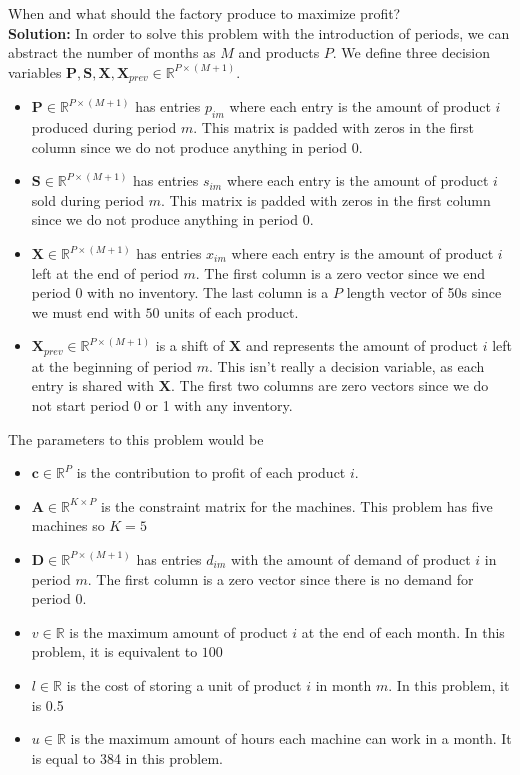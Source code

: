 \documentclass[11pt]{article}
\begin{document}
When and what should the factory produce to maximize profit?
\\
\textbf{Solution: }
In order to solve this problem with the introduction of periods, we can abstract the number of months as $M$ and products $P$.
We define three decision variables $\textbf{P}, \textbf{S}, \textbf{X}, \textbf{X}_{prev} \in \mathbb{R}^{P \times (M+1)}$.
\begin{itemize}
  \item $\textbf{P} \in \mathbb{R}^{P \times (M+1)}$ has entries $p_{i m}$ where each entry is the amount of product $i$ produced during period $m$. 
        This matrix is padded with zeros in the first column since we do not produce anything in period 0.
  \item $\textbf{S} \in \mathbb{R}^{P \times (M+1)}$ has entries $s_{i m}$ where each entry is the amount of product $i$ sold during period $m$.
        This matrix is padded with zeros in the first column since we do not produce anything in period 0.
  \item $\textbf{X} \in \mathbb{R}^{P \times (M+1)}$ has entries $x_{i m}$ where each entry is the amount of product $i$ left at the end of period $m$.
        The first column is a zero vector since we end period 0 with no inventory.
        The last column is a $P$ length vector of 50s since we must end with $50$ units of each product.
  \item $\textbf{X}_{prev} \in \mathbb{R}^{P \times (M+1)}$ is a shift of $\textbf{X}$ and represents the amount of product $i$ left at the beginning of period $m$.
        This isn't really a decision variable, as each entry is shared with $\textbf{X}$.
        The first two columns are zero vectors since we do not start period 0 or 1 with any inventory.
\end{itemize}
The parameters to this problem would be
\begin{itemize}
  \item $\textbf{c} \in \mathbb{R}^P$ is the contribution to profit of each product $i$.
  \item $\textbf{A} \in \mathbb{R}^{K \times P}$ is the constraint matrix for the machines.
        This problem has five machines so $K=5$
  \item $\textbf{D} \in \mathbb{R}^{P \times (M+1)}$ has entries $d_{i m}$ with the amount of demand of product $i$ in period $m$.
        The first column is a zero vector since there is no demand for period 0.
  \item $v \in \mathbb{R}$ is the maximum amount of product $i$ at the end of each month.
        In this problem, it is equivalent to $ 100$
  \item $l \in \mathbb{R}$ is the cost of storing a unit of product $i$ in month $m$.
        In this problem, it is 0.5
  \item $u \in \mathbb{R}$ is the maximum amount of hours each machine can work in a month.
        It is equal to 384 in this problem.
\end{itemize}
\end{document}
